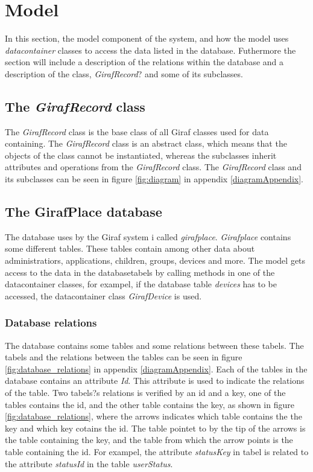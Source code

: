 \section{Model}
\label{model}

In this section, the model component of the system, and how the model uses \textit{datacontainer} classes to access the data listed in the database. Futhermore the section will include a description of the relations within the database and a description of the class, \textit{GirafRecord}? and some of its subclasses.

\subsection{The \textit{GirafRecord} class}
The \textit{GirafRecord} class is the base class of all Giraf classes used for data containing. The \textit{GirafRecord} class is an abstract class, which means that the objects of the class cannot be instantiated, whereas the subclasses inherit attributes and operations from the \textit{GirafRecord} class. The \textit{GirafRecord} class and its subclasses can be seen in figure \ref{fig:diagram} in appendix \ref{diagramAppendix}.

\subsection{The GirafPlace database}
The database uses by the Giraf system i called \textit{girafplace}. \textit{Girafplace} contains some different tables. These tables contain among other data about administratiors, applications, children, groups, devices and more.
The model gets access to the data in the databasetabels by calling methods in one of the datacontainer classes, for exampel, if the database table \textit{devices} has to be accessed, the datacontainer class \textit{GirafDevice} is used.

\subsubsection{Database relations}
The database contains some tables and some relations between these tabels. The tabels and the relations between the tables can be seen in figure \ref{fig:database_relations} in appendix \ref{diagramAppendix}.
Each of the tables in the database contains an attribute \textit{Id}. This attribute is used to indicate the relations of the table. Two tabels?s relations is verified by an id and a key, one of the tables contains the id, and the other table contains the key, as shown in figure \ref{fig:database_relations}, where the arrows indicates which table contains the the key and which key cotains the id. The table pointet to by the tip of the arrows is the table containing the key, and the table from which the arrow points is the table containing the id. 
For exampel, the attribute  \textit{statusKey} in tabel  is related to the attribute \textit{statusId} in the table \textit{userStatus}.